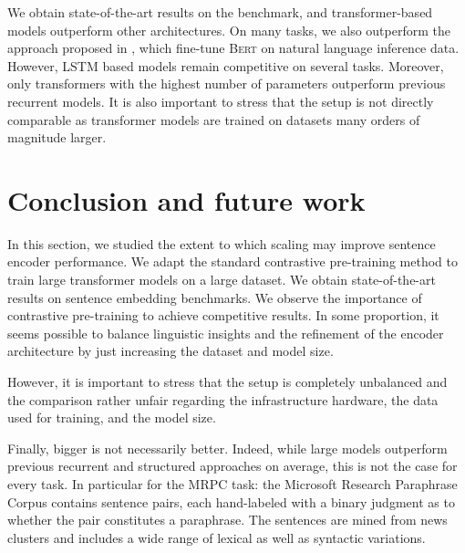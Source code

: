 We obtain state-of-the-art results on the benchmark, and transformer-based models outperform other architectures. On many tasks, we also outperform the approach proposed in \textcite{reimers_19}, which fine-tune \textsc{Bert} on natural language inference data. However, LSTM based models remain competitive on several tasks. Moreover, only transformers with the highest number of parameters outperform previous recurrent models. It is also important to stress that the setup is not directly comparable as transformer models are trained on datasets many orders of magnitude larger.

\section{Conclusion and future work}



In this section, we studied the extent to which scaling may improve sentence encoder performance. We adapt the standard contrastive pre-training method to train large transformer models on a large dataset. We obtain state-of-the-art results on sentence embedding benchmarks. We observe the importance of contrastive pre-training to achieve competitive results. In some proportion, it seems possible to balance linguistic insights and the refinement of the encoder architecture by just increasing the dataset and model size. 

However, it is important to stress that the setup is completely unbalanced and the comparison rather unfair regarding the infrastructure hardware, the data used for training, and the model size.

Finally, bigger is not necessarily better. Indeed, while large models outperform previous recurrent and structured approaches on average, this is not the case for every task. In particular for the MRPC task: the Microsoft Research Paraphrase Corpus contains  sentence pairs, each hand-labeled with a binary judgment as to whether the pair constitutes a paraphrase. The sentences are mined from news clusters and includes a wide range of lexical as well as syntactic variations.


\setlength\tabcolsep{6pt} %

